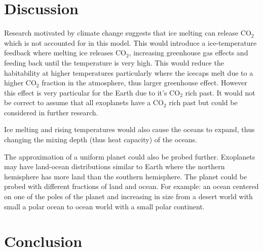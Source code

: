\documentclass[12pt, onecolumn]{revtex4-2}    %
\begin{document}

\section{Discussion} \label{sec:Discussion}
Research motivated by climate change suggests that ice melting can release CO$_2$ which is not accounted for in this model.
This would introduce a ice-temperature feedback where melting ice releases CO$_2$, increasing greenhouse gas effects and feeding back until the temperature is very high.
This would reduce the habitability at higher temperatures particularly where the icecaps melt due to a higher CO$_2$ fraction in the atmosphere, thus larger greenhouse effect.
However this effect is very particular for the Earth due to it's CO$_2$ rich past.
It would not be correct to assume that all exoplanets have a CO$_2$ rich past but could be considered in further research.

Ice melting and rising temperatures would also cause the oceans to expand, thus changing the mixing depth (thus heat capacity) of the oceans.

The approximation of a uniform planet could also be probed further.
Exoplanets may have land-ocean distributions similar to Earth where the northern hemisphere has more land than the southern hemisphere.
The planet could be probed with different fractions of land and ocean.
For example: an ocean centered on one of the poles of the planet and increasing in size from a desert world with small a polar ocean to ocean world with a small polar continent.

\section{Conclusion} \label{sec:Conclusion}
\end{document}
